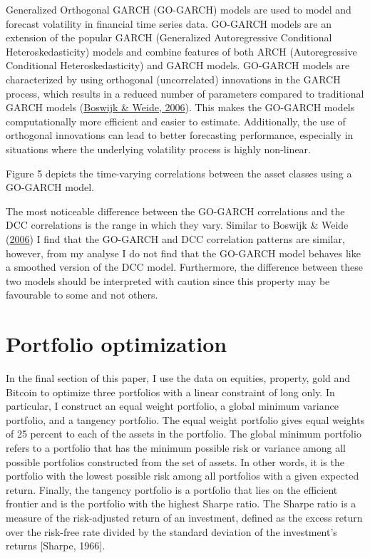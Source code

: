 \documentclass[11pt,preprint, authoryear]{elsarticle}
\numberwithin{equation}{section}
\numberwithin{figure}{section}
\numberwithin{table}{section}
\begin{document}
Generalized Orthogonal GARCH (GO-GARCH) models are used to model and
forecast volatility in financial time series data. GO-GARCH models are
an extension of the popular GARCH (Generalized Autoregressive
Conditional Heteroskedasticity) models and combine features of both ARCH
(Autoregressive Conditional Heteroskedasticity) and GARCH models.
GO-GARCH models are characterized by using orthogonal (uncorrelated)
innovations in the GARCH process, which results in a reduced number of
parameters compared to traditional GARCH models
(\protect\hyperlink{ref-boswijk2006wake}{Boswijk \& Weide, 2006}). This
makes the GO-GARCH models computationally more efficient and easier to
estimate. Additionally, the use of orthogonal innovations can lead to
better forecasting performance, especially in situations where the
underlying volatility process is highly non-linear.

Figure 5 depicts the time-varying correlations between the asset classes
using a GO-GARCH model.

The most noticeable difference between the GO-GARCH correlations and the
DCC correlations is the range in which they vary. Similar to Boswijk \&
Weide (\protect\hyperlink{ref-boswijk2006wake}{2006}) I find that the
GO-GARCH and DCC correlation patterns are similar, however, from my
analyse I do not find that the GO-GARCH model behaves like a smoothed
version of the DCC model. Furthermore, the difference between these two
models should be interpreted with caution since this property may be
favourable to some and not others.

\hypertarget{portfolio-optimization}{%
\section{Portfolio optimization}\label{portfolio-optimization}}

In the final section of this paper, I use the data on equities,
property, gold and Bitcoin to optimize three portfolios with a linear
constraint of long only. In particular, I construct an equal weight
portfolio, a global minimum variance portfolio, and a tangency
portfolio. The equal weight portfolio gives equal weights of 25 percent
to each of the assets in the portfolio. The global minimum portfolio
refers to a portfolio that has the minimum possible risk or variance
among all possible portfolios constructed from the set of assets. In
other words, it is the portfolio with the lowest possible risk among all
portfolios with a given expected return. Finally, the tangency portfolio
is a portfolio that lies on the efficient frontier and is the portfolio
with the highest Sharpe ratio. The Sharpe ratio is a measure of the
risk-adjusted return of an investment, defined as the excess return over
the risk-free rate divided by the standard deviation of the investment's
returns {[}Sharpe, 1966{]}.
\end{document}
